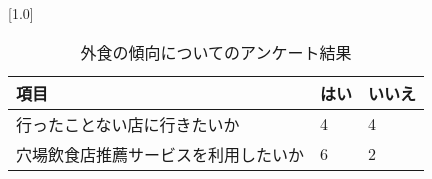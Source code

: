 \begin{table}[H]
\centering
\caption{外食の傾向についてのアンケート結果}
\label{table:questionnaire:tendency}
\small
\scalebox{0.7}[1.0]{
\begin{tabular}{|l|l|l|}
\hline
項目 & はい & いいえ \\ \hline
行ったことない店に行きたいか & 4 & 4 \\ \hline
穴場飲食店推薦サービスを利用したいか & 6 & 2 \\ \hline
\end{tabular}
}
\end{table}
